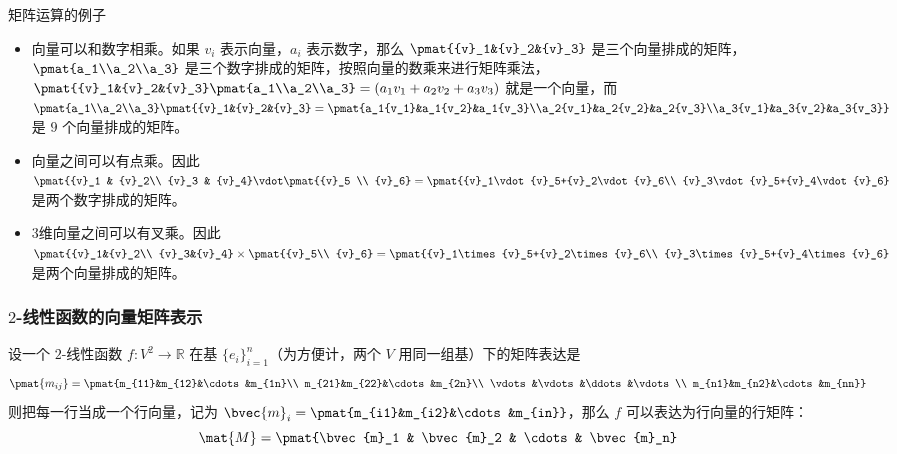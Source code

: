 \begin{example}{矩阵运算的例子}

\begin{itemize}
%
\item 向量可以和数字相乘。如果 ${v}_i$ 表示向量，$a_i$ 表示数字，那么 $\pmat{{v}_1&{v}_2&{v}_3}$ 是三个向量排成的矩阵，$\pmat{a_1\\a_2\\a_3}$ 是三个数字排成的矩阵，按照向量的数乘来进行矩阵乘法，$\pmat{{v}_1&{v}_2&{v}_3}\pmat{a_1\\a_2\\a_3}=(a_1{v}_1+a_2{v}_2+a_3{v}_3)$ 就是一个向量，而 $\pmat{a_1\\a_2\\a_3}\pmat{{v}_1&{v}_2&{v}_3}=\pmat{a_1{v_1}&a_1{v_2}&a_1{v_3}\\a_2{v_1}&a_2{v_2}&a_2{v_3}\\a_3{v_1}&a_3{v_2}&a_3{v_3}}$ 是 $9$ 个向量排成的矩阵。
\item 向量之间可以有点乘。因此 $\pmat{{v}_1 & {v}_2\\ {v}_3 & {v}_4}\vdot \pmat{{v}_5 \\ {v}_6}=\pmat{{v}_1\vdot{v}_5+{v}_2\vdot{v}_6\\ {v}_3\vdot{v}_5+{v}_4\vdot{v}_6}$ 是两个数字排成的矩阵。
\item 3维向量之间可以有叉乘。因此 $\pmat{{v}_1&{v}_2\\ {v}_3&{v}_4}\times\pmat{{v}_5\\ {v}_6}=\pmat{{v}_1\times{v}_5+{v}_2\times{v}_6\\ {v}_3\times{v}_5+{v}_4\times{v}_6}$ 是两个向量排成的矩阵。
\end{itemize}
\end{example}


\subsubsection{$2$-线性函数的向量矩阵表示}

设一个 $2$-线性函数 $f:V^2\rightarrow\mathbb{R}$ 在基 $\{{e}_i\}_{i=1}^n$（为方便计，两个 $V$ 用同一组基）下的矩阵表达是
\begin{equation}
\pmat{m_{ij}}=\pmat{m_{11}&m_{12}&\cdots&m_{1n}\\ m_{21}&m_{22}&\cdots&m_{2n}\\ \vdots&\vdots&\ddots&\vdots\\ m_{n1}&m_{n2}&\cdots&m_{nn}}
\end{equation}
则把每一行当成一个行向量，记为 $\bvec {m}_i = \pmat{m_{i1}&m_{i2}&\cdots&m_{in}}$，那么 $f$ 可以表达为行向量的行矩阵：
\begin{equation}\label{Tensor_eq3}
\mat{M}=\pmat{\bvec{m}_1 & \bvec{m}_2 & \cdots & \bvec{m}_n}
\end{equation}

